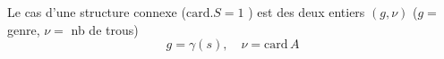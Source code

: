  Le cas d'une structure connexe ($\mathrm{card}.S=1$ ) est   des deux entiers $(g,\nu)$ \quad ($g=$ genre, $\nu={}$ nb de trous)
\[
 g=\gamma(s),\quad \nu=\mathrm{card}\,A
\]

